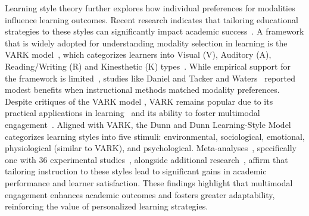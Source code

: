Learning style theory further explores how individual preferences for modalities influence learning outcomes. Recent research indicates that tailoring educational strategies to these styles can significantly impact academic success~\cite{newble1985learning}. %
A framework that is widely adopted for understanding modality selection in learning is the VARK model~\cite{fleming2001vark}, which categorizes learners into Visual (V), Auditory (A), Reading/Writing (R) and Kinesthetic (K) types~\cite{fleming1992not, fleming1995m, fleming2001vark}. %
While empirical support for the framework is limited~\cite{pashler2008learning, rogowsky2015matching}, studies like Daniel and Tacker\cite{daniel1974preferred} and Waters~\cite{waters1972analysis} reported modest benefits when instructional methods matched modality preferences. Despite critiques of the VARK model%
, VARK remains popular due to its practical applications in learning~\cite{sulistyanto2023effectiveness, noor2023bridging, el2024influence, laxman2014exploration} and its ability to foster multimodal engagement~\cite{sulistyanto2023effectiveness}. Aligned with VARK, the Dunn and Dunn Learning-Style Model~\cite{dunn1993teaching, dunn1984learning} categorizes learning styles into five stimuli: environmental, sociological, emotional, physiological (similar to VARK), and psychological. Meta-analyses~\cite{lovelace2005meta, dunn1995meta}, specifically one with 36 experimental studies~\cite{dunn1995meta}, alongside additional research~\cite{oweini2016effects}, affirm that tailoring instruction to these styles lead to significant gains in academic performance and learner satisfaction. These findings highlight that multimodal engagement enhances academic outcomes and fosters greater adaptability, reinforcing the value of personalized learning strategies.

